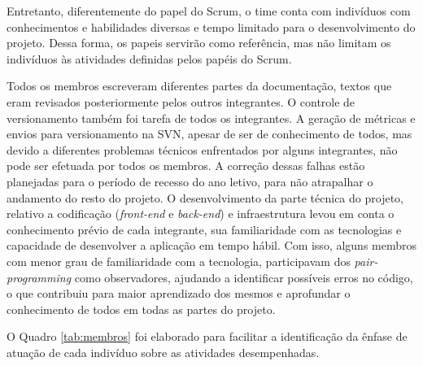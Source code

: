 \documentclass[
    12pt,               %
    openright,          %
    oneside,
    a4paper,            %
    BIBLATEX,           %
    TODO,               %
    english,            %
    brazil              %
    ]{ifsp-spo-inf-ctds}
\begin{document}
            Entretanto, diferentemente do papel do Scrum, o time conta com indivíduos com conhecimentos e habilidades diversas e tempo limitado para o desenvolvimento do projeto. Dessa forma, os papeis servirão como referência, mas não limitam os indivíduos às atividades definidas pelos papéis do Scrum.
            
            Todos os membros escreveram diferentes partes da documentação, textos que eram revisados posteriormente pelos outros integrantes. O controle de versionamento também foi tarefa de todos os integrantes. A geração de métricas e envios para versionamento na SVN, apesar de ser de conhecimento de todos, mas devido a diferentes problemas técnicos enfrentados por alguns integrantes, não pode ser efetuada por todos os membros. A correção dessas falhas estão planejadas para o período de recesso do ano letivo, para não atrapalhar o andamento do resto do projeto. O desenvolvimento da parte técnica do projeto, relativo a codificação (\emph{front-end} e \emph{back-end}) e infraestrutura levou em conta o conhecimento prévio de cada integrante, sua familiaridade com as tecnologias e capacidade de desenvolver a aplicação em tempo hábil. Com isso, alguns membros com menor grau de familiaridade com a tecnologia, participavam dos \emph{pair-programming} como observadores, ajudando a identificar possíveis erros no código, o que contribuiu para maior aprendizado dos mesmos e aprofundar o conhecimento de todos em todas as partes do projeto.
            
             O Quadro \ref{tab:membros} foi elaborado para facilitar a identificação da ênfase de atuação de cada indivíduo sobre as atividades desempenhadas.
\end{document}
